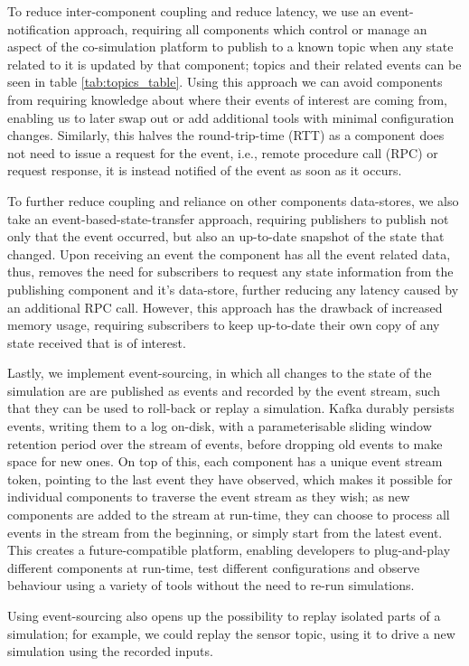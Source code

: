 To reduce inter-component coupling and reduce latency, we use an event-notification approach, requiring all components which control or manage an aspect of the co-simulation platform to publish to a known topic when any state related to it is updated by that component; topics and their related events can be seen in table \ref{tab:topics_table}. Using this approach we can avoid components from requiring knowledge about where their events of interest are coming from, enabling us to later swap out or add additional tools with minimal configuration changes. Similarly, this halves the round-trip-time (RTT) as a component does not need to issue a request for the event, i.e., remote procedure call (RPC) or request response, it is instead notified of the event as soon as it occurs.

To further reduce coupling and reliance on other components data-stores, we also take an event-based-state-transfer approach, requiring publishers to publish not only that the event occurred, but also an up-to-date snapshot of the state that changed. Upon receiving an event the component has all the event related data, thus, removes the need for subscribers to request any state information from the publishing component and it's data-store, further reducing any latency caused by an additional RPC call. However, this approach has the drawback of increased memory usage, requiring subscribers to keep up-to-date their own copy of any state received that is of interest.

Lastly, we implement event-sourcing, in which all changes to the state of the simulation are are published as events and recorded by the event stream, such that they can be used to roll-back or replay a simulation. Kafka durably persists events, writing them to a log on-disk, with a parameterisable sliding window retention period over the stream of events, before dropping old events to make space for new ones. On top of this, each component has a unique event stream token, pointing to the last event they have observed, which makes it possible for individual components to traverse the event stream as they wish; as new components are added to the stream at run-time, they can choose to process all events in the stream from the beginning, or simply start from the latest event. This creates a future-compatible platform, enabling developers to plug-and-play different components at run-time, test different configurations and observe behaviour using a variety of tools without the need to re-run simulations.

Using event-sourcing also opens up the possibility to replay isolated parts of a simulation; for example, we could replay the sensor topic, using it to drive a new simulation using the recorded inputs.

